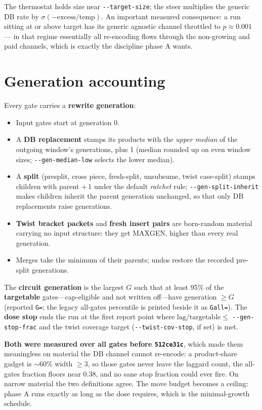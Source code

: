 \documentclass[11pt]{article}
\newcommand{\code}[1]{\texttt{#1}}
\begin{document}
The thermostat holds size near \code{-{}-target-size}; the steer multiplies
the generic DB rate by $\sigma(-\text{excess}/\text{temp})$. An important
measured consequence: a run sitting at or above target has its generic
agnostic channel throttled to $p\approx 0.001$ --- in that regime
essentially all re-encoding flows through the non-growing and paid
channels, which is exactly the discipline phase A wants.

\section{Generation accounting}\label{sec:gen}
Every gate carries a \textbf{rewrite generation}:
\begin{itemize}
\item Input gates start at generation 0.
\item A \textbf{DB replacement} stamps its products with the \emph{upper
median} of the outgoing window's generations, plus 1 (median rounded up on
even window sizes; \code{-{}-gen-median-low} selects the lower median).
\item A \textbf{split} (presplit, cross piece, fresh-split, unsubsume,
twist case-split) stamps children with parent $+\,1$ under the default
\emph{ratchet} rule; \code{-{}-gen-split-inherit} makes children inherit the
parent generation unchanged, so that only DB replacements raise
generations.
\item \textbf{Twist bracket packets} and \textbf{fresh insert pairs} are
born-random material carrying no input structure: they get MAXGEN, higher
than every real generation.
\item Merges take the minimum of their parents; undos restore the recorded
pre-split generations.
\end{itemize}
The \textbf{circuit generation} is the largest $G$ such that at least 95\%
of the \textbf{targetable} gates---cap-eligible and not written off---have
generation $\geq G$ (reported \code{G=}; the legacy all-gates percentile is
printed beside it as \code{Gall=}). The \textbf{dose stop} ends the run at the
first report point where $\mathrm{lag}/\mathrm{targetable} \leq$
\code{-{}-gen-stop-frac} and the twist coverage target
(\code{-{}-twist-cov-stop}, if set) is met.

\textbf{Both were measured over all gates before \code{512ce31c}}, which made
them meaningless on material the DB channel cannot re-encode: a product-share
gadget is ${\sim}60\%$ width $\geq 3$, so those gates never leave the laggard
count, the all-gates fraction floors near $0.38$, and no sane stop fraction
could ever fire. On narrow material the two definitions agree. The move budget becomes a ceiling: phase A runs exactly as long as the
dose requires, which is the minimal-growth schedule.
\end{document}
